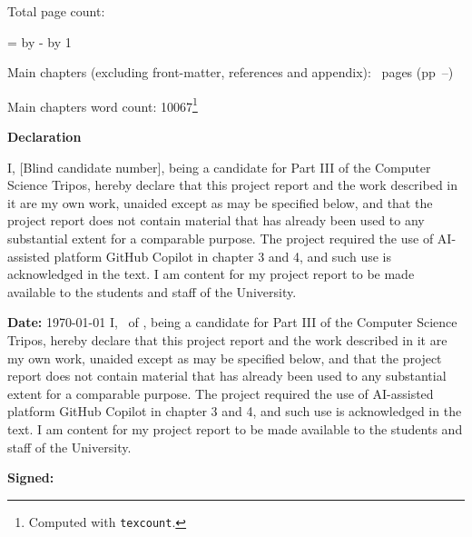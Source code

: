 \begin{sffamily}
\begin{titlepage}
        \makeatother
    \end{titlepage}

    \newpage

    Total page count: \pageref{lastpage}

    \makeatletter
    \@tempcnta=\relax%
    \advance\@tempcnta by -%
    \advance\@tempcnta by 1%
    \xdef\contentpages{\the\@tempcnta}%
    \makeatother

    Main chapters (excluding front-matter, references and appendix):
    \contentpages~pages
    (pp~\pageref{firstcontentpage}--\pageref{lastcontentpage})

    Main chapters word count: 10067\footnote{Computed with \texttt{texcount}.}

\end{sffamily}

\vspace{\fill}
\onehalfspacing
\makeatletter
\textbf{\Huge Declaration}
\vspace{40pt}

\ifsubmission
    I, [Blind candidate number], being a candidate for Part III of the Computer Science Tripos, hereby declare that this project report and the work described in it are my own work, unaided except as may be specified below, and that the project report does not contain material that has already been used to any substantial extent for a comparable purpose. The project required the use of AI-assisted platform GitHub Copilot in chapter 3 and 4, and such use is acknowledged in the text. I am content for my project report to be made available to the students and staff of the University.

    \bigskip
    \textbf{Date:} \today
\else
    I, \@author\ of \college, being a candidate for Part III of the Computer Science Tripos, hereby declare that this project report and the work described in it are my own work, unaided except as may be specified below, and that the project report does not contain material that has already been used to any substantial extent for a comparable purpose. The project required the use of AI-assisted platform GitHub Copilot in chapter 3 and 4, and such use is acknowledged in the text. I am content for my project report to be made available to the students and staff of the University.

    \bigskip
    \textbf{Signed:} \@author

